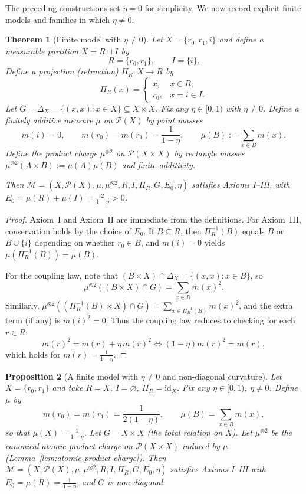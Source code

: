 \documentclass[11pt]{article}
\numberwithin{equation}{section}
\newtheorem{theorem}{Theorem}[section]
\newtheorem{proposition}[theorem]{Proposition}
\theoremstyle{definition}
\begin{document}
The preceding constructions set $\eta=0$ for simplicity. We now record explicit finite models
and families in which $\eta\neq 0$.

\begin{theorem}[Finite model with $\eta\neq 0$]\label{thm:eta-nonzero-finite}
Let $X=\{r_0,r_1,i\}$ and define a measurable partition $X=R\sqcup I$ by
\[
R=\{r_0,r_1\},\qquad I=\{i\}.
\]
Define a projection (retraction) $\Pi_R:X\to R$ by
\[
\Pi_R(x)=
\begin{cases}
x,& x\in R,\\
r_0,& x=i\in I.
\end{cases}
\]
Let $G=\Delta_X=\{(x,x):x\in X\}\subseteq X\times X$. Fix any $\eta\in[0,1)$ with $\eta\neq 0$.
Define a finitely additive measure $\mu$ on $\mathcal P(X)$ by point masses
\[
m(i)=0,\qquad m(r_0)=m(r_1)=\frac{1}{1-\eta},\qquad \mu(B):=\sum_{x\in B} m(x).
\]
Define the product charge $\mu^{\otimes 2}$ on $\mathcal P(X\times X)$ by rectangle masses
$\mu^{\otimes 2}(A\times B):=\mu(A)\mu(B)$ and finite additivity.

Then $\mathcal M=(X,\allowbreak \mathcal P(X),\allowbreak \mu,\allowbreak \mu^{\otimes2},\allowbreak R,\allowbreak I,\allowbreak \Pi_R,\allowbreak G,\allowbreak E_0,\allowbreak \eta)$ satisfies Axioms I--III, with
$E_0=\mu(R)+\mu(I)=\frac{2}{1-\eta}>0$.
\end{theorem}

\begin{proof}
Axiom~I and Axiom~II are immediate from the definitions. For Axiom~III, conservation holds by the choice of $E_0$.
If $B\subseteq R$, then $\Pi_R^{-1}(B)$ equals $B$ or $B\cup\{i\}$ depending on whether $r_0\in B$, and $m(i)=0$ yields
$\mu(\Pi_R^{-1}(B))=\mu(B)$.

For the coupling law, note that $(B\times X)\cap \Delta_X=\{(x,x):x\in B\}$, so
\[
\mu^{\otimes 2}((B\times X)\cap G)=\sum_{x\in B} m(x)^2.
\]
Similarly, $\mu^{\otimes 2}((\Pi_R^{-1}(B)\times X)\cap G)=\sum_{x\in \Pi_R^{-1}(B)} m(x)^2$, and the extra term (if any) is $m(i)^2=0$.
Thus the coupling law reduces to checking for each $r\in R$:
\[
m(r)^2=m(r)+\eta\,m(r)^2 \iff (1-\eta)m(r)^2=m(r),
\]
which holds for $m(r)=\frac{1}{1-\eta}$.
\end{proof}

\begin{proposition}[A finite model with $\eta\neq 0$ and non-diagonal curvature]\label{prop:eta-nonzero-nondiag}
Let $X=\{r_0,r_1\}$ and take $R=X$, $I=\varnothing$, $\Pi_R=\mathrm{id}_X$.
Fix any $\eta\in[0,1)$, $\eta\neq 0$. Define $\mu$ by
\[
m(r_0)=m(r_1)=\frac{1}{2(1-\eta)},\qquad \mu(B)=\sum_{x\in B}m(x),
\]
so that $\mu(X)=\frac{1}{1-\eta}$. Let $G=X\times X$ (the total relation on $X$).
Let $\mu^{\otimes2}$ be the canonical atomic product charge on $\mathcal P(X\times X)$ induced by $\mu$ (Lemma~\ref{lem:atomic-product-charge}).
Then $\mathcal M=(X,\allowbreak \mathcal P(X),\allowbreak \mu,\allowbreak \mu^{\otimes2},\allowbreak R,\allowbreak I,\allowbreak \Pi_R,\allowbreak G,\allowbreak E_0,\allowbreak \eta)$ satisfies Axioms I--III with $E_0=\mu(R)=\frac{1}{1-\eta}$, and $G$ is non-diagonal.
\end{proposition}
\end{document}
